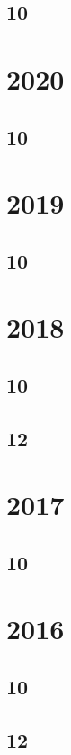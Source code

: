 \documentclass[11pt]{book}
\begin{document}
\subsection{10}

\section{2020}
\subsection{10}

\section{2019} 
\subsection{10}

\section{2018} 
\subsection{10}

\subsection{12}

\section{2017}
\subsection{10}




\section{2016}
\subsection{10}

\subsection{12}

\end{document}

